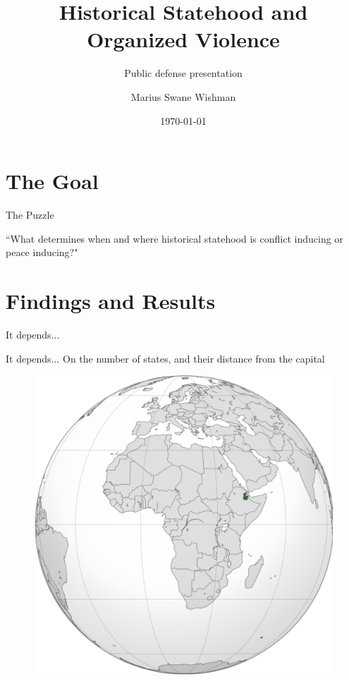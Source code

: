 \documentclass{beamer}
\title[Janus-Faced]{Historical Statehood and Organized Violence}
\subtitle{Public defense presentation}
\author[Wishman]{Marius Swane Wishman}
\date{\today}
\institute{NTNU}
\begin{document}
\begin{frame}[plain]
\titlepage 
\end{frame}

\section{The Goal}

\begin{frame}
	\centering
	\Large The Puzzle
\end{frame}

\begin{frame} 
	\centering
	\Large ``What determines when and where historical
	statehood is conflict inducing or peace inducing?"

\end{frame}

\section{Findings and Results}

\begin{frame} 
	\centering
	\Large It depends...
\end{frame}

\begin{frame}{It depends...}
	\centering
	\Large On the number of states, and their distance from the capital
\end{frame}

\begin{frame}
	\begin{figure}
		\includegraphics[width=.7\linewidth]{img/aussa.png}
	\end{figure}
\end{frame}
\end{document}
